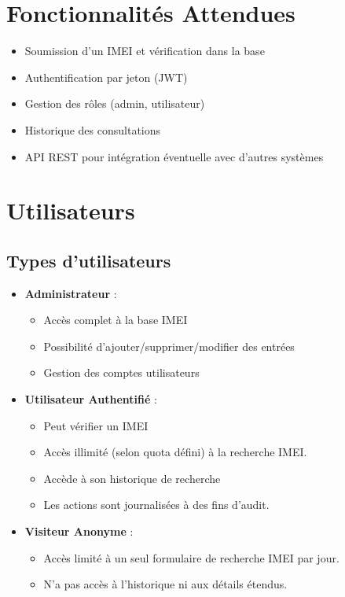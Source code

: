 \documentclass[12pt,a4paper]{article}
\begin{document}
\section{Fonctionnalités Attendues}
\begin{itemize}
    \item Soumission d’un IMEI et vérification dans la base
    \item Authentification par jeton (JWT)
    \item Gestion des rôles (admin, utilisateur)
    \item Historique des consultations
    \item API REST pour intégration éventuelle avec d’autres systèmes
\end{itemize}

\section{Utilisateurs}
\subsection{Types d’utilisateurs}
\begin{itemize}
    \item \textbf{Administrateur} :
        \begin{itemize}
            \item Accès complet à la base IMEI
            \item Possibilité d’ajouter/supprimer/modifier des entrées
            \item Gestion des comptes utilisateurs
        \end{itemize}
    \item \textbf{Utilisateur Authentifié} :
        \begin{itemize}
            \item Peut vérifier un IMEI
            \item Accès illimité (selon quota défini) à la recherche IMEI.
            \item Accède à son historique de recherche
            \item Les actions sont journalisées à des fins d’audit.
        \end{itemize}
    \item \textbf{Visiteur Anonyme} :
        \begin{itemize}
            \item Accès limité à un seul formulaire de recherche IMEI par jour.
            \item N’a pas accès à l’historique ni aux détails étendus.
        \end{itemize}
\end{itemize}
\end{document}
